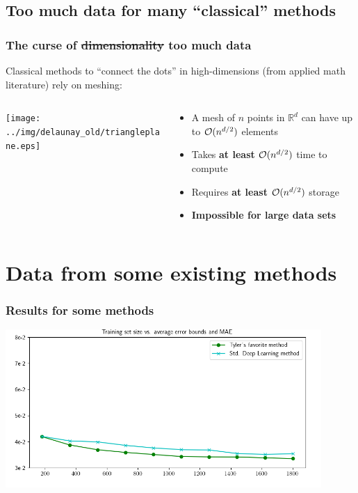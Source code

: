 \documentclass[aspectratio=169]{beamer}
\begin{document}
\subsection{Too much data for many ``classical'' methods}

\begin{frame}\frametitle{The curse of \sout{dimensionality} too much data}

Classical methods to ``connect the dots'' in high-dimensions
(from applied math literature) rely on meshing:

\begin{columns}
\begin{column}{0.5\textwidth}
\texttt{[image: ../img/delaunay\_old/triangleplane.eps]}
\end{column}
\begin{column}{0.5\textwidth}
\begin{itemize}
\pause \item A mesh of $n$ points in $\mathbb{R}^d$ can have up to
${\cal O}(n^{d/2})$ elements
\pause \item Takes {\bf at least} ${\cal O}(n^{d/2})$ time to compute
\pause \item Requires {\bf at least} ${\cal O}(n^{d/2})$ storage
\pause \item {\bf Impossible for large data sets}
\end{itemize}
\end{column}
\end{columns}
\end{frame}

\section{Data from some existing methods}
\begin{frame}\frametitle{Results for some methods}
\begin{center}
\includegraphics[width=0.9\textwidth]{../img/delaunay_new/wind_results_tyler.png}
\end{center}
\end{frame}
\end{document}
